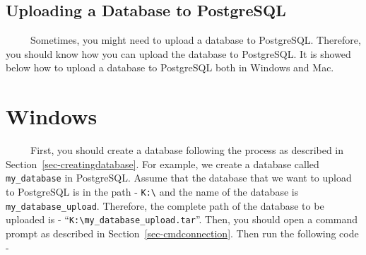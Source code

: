 \documentclass[
  letterpaper,
  DIV=11,
  numbers=noendperiod]{scrreprt}
\begin{document}
\subsection{Uploading a Database to
PostgreSQL}\label{uploading-a-database-to-postgresql}

~~~~~Sometimes, you might need to upload a database to PostgreSQL.
Therefore, you should know how you can upload the database to
PostgreSQL. It is showed below how to upload a database to PostgreSQL
both in Windows and Mac.

\section{Windows}

~~~~~First, you should create a database following the process as
described in Section~\ref{sec-creatingdatabase}. For example, we create
a database called \texttt{my\_database} in PostgreSQL. Assume that the
database that we want to upload to PostgreSQL is in the path -
\texttt{K:\textbackslash{}} and the name of the database is
\texttt{my\_database\_upload}. Therefore, the complete path of the
database to be uploaded is -
``\texttt{K:\textbackslash{}my\_database\_upload.tar}''. Then, you
should open a command prompt as described in
Section~\ref{sec-cmdconnection}. Then run the following code -
\end{document}
